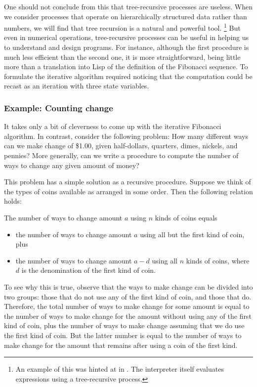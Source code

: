 One should not conclude from this that tree-recursive processes are useless.
When we consider processes that operate on hierarchically structured data rather than numbers, we will find that tree recursion is a natural and powerful tool.%
\footnote{
	An example of this was hinted at in .
	The interpreter itself evaluates expressions using a tree-recursive process.
}
But even in numerical operations, tree-recursive processes can be useful in helping us to understand and design programs.
For instance, although the first  procedure is much less efficient than the second one, it is more straightforward, being little more than a translation into Lisp of the definition of the Fibonacci sequence.
To formulate the iterative algorithm required noticing that the computation could be recast as an iteration with three state variables.



\subsubsection*{Example: Counting change}

It takes only a bit of cleverness to come up with the iterative Fibonacci algorithm.
In contrast, consider the following problem:
How many different ways can we make change of \$1.00, given half-dollars, quarters, dimes, nickels, and pennies?
More generally, can we write a procedure to compute the number of ways to change any given amount of money?

This problem has a simple solution as a recursive procedure.
Suppose we think of the types of coins available as arranged in some order.
Then the following relation holds:

The number of ways to change amount \( a \) using \( n \) kinds of coins equals
\begin{itemize}

	\item
		the number of ways to change amount \( a \) using all but the first kind of coin, plus

	\item
		the number of ways to change amount \( a - d \) using all \( n \) kinds of coins, where \( d \) is the denomination of the first kind of coin.

\end{itemize}

To see why this is true, observe that the ways to make change can be divided into two groups:
those that do not use any of the first kind of coin, and those that do.
Therefore, the total number of ways to make change for some amount is equal to the number of ways to make change for the amount without using any of the first kind of coin, plus the number of ways to make change assuming that we do use the first kind of coin.
But the latter number is equal to the number of ways to make change for the amount that remains after using a coin of the first kind.

